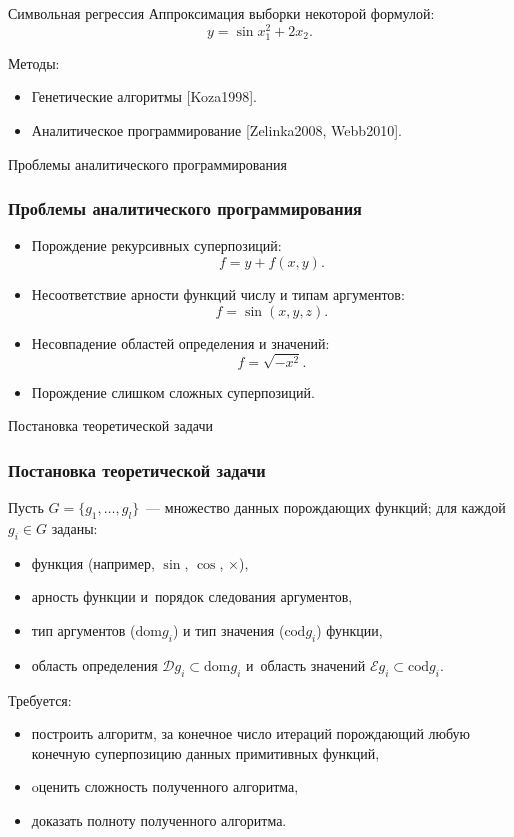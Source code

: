 \documentclass{beamer}
\begin{document}
\begin{frame}{Символьная регрессия}
  Аппроксимация выборки некоторой формулой:
  \[
  y = \sin x_1^2 + 2x_2.
  \]

  Методы:
  \begin{itemize}
	\item Генетические алгоритмы [Koza1998].
	\item Аналитическое программирование [Zelinka2008, Webb2010].
  \end{itemize}
\end{frame}

\begin{frame}{Проблемы аналитического программирования}
  \frametitle{Проблемы аналитического программирования}

  \begin{itemize}
	\item Порождение рекурсивных суперпозиций:
	  \[
	  f = y + f (x, y).
	  \]
	\item Несоответствие арности функций числу и типам аргументов:
	  \[
	  f = \sin (x, y, z).
	  \]
	\item Несовпадение областей определения и значений:
	  \[
	  f = \sqrt{-x^2}.
	  \]
	\item Порождение слишком сложных суперпозиций.
  \end{itemize}
\end{frame}

\begin{frame}{Постановка теоретической задачи}
  \frametitle{Постановка теоретической задачи}

  Пусть $G = \{ g_1, \dots, g_l \}$~--- множество данных порождающих
  функций; для каждой $g_i \in G$ заданы:
  \begin{itemize}
	\item функция (например, $\sin$, $\cos$, $\times$),
	\item арность функции и~порядок следования аргументов,
	\item тип аргументов ($\text{dom} g_i$) и тип значения ($\text{cod} g_i$) функции,
	\item область определения $\mathcal{D} g_i \subset \text{dom} g_i$ и~область
	  значений $\mathcal{E} g_i \subset \text{cod} g_i$.
  \end{itemize}
  Требуется:
  \begin{itemize}
	\item построить алгоритм, за конечное число итераций
	  порождающий любую конечную суперпозицию данных примитивных функций,
	\item oценить сложность полученного алгоритма,
	\item доказать полноту полученного алгоритма.
  \end{itemize}
\end{frame}
\end{document}
